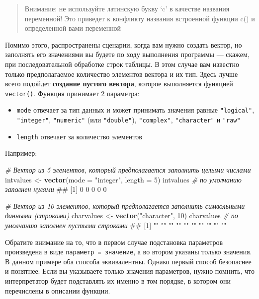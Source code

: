 \documentclass[]{book}
\newenvironment{Shaded}{\begin{snugshade}}{\end{snugshade}}
\newcommand{\KeywordTok}[1]{\textcolor[rgb]{0.13,0.29,0.53}{\textbf{#1}}}
\newcommand{\DataTypeTok}[1]{\textcolor[rgb]{0.13,0.29,0.53}{#1}}
\newcommand{\DecValTok}[1]{\textcolor[rgb]{0.00,0.00,0.81}{#1}}
\newcommand{\StringTok}[1]{\textcolor[rgb]{0.31,0.60,0.02}{#1}}
\newcommand{\CommentTok}[1]{\textcolor[rgb]{0.56,0.35,0.01}{\textit{#1}}}
\newcommand{\NormalTok}[1]{#1}
\providecommand{\tightlist}{%
  \setlength{\itemsep}{0pt}\setlength{\parskip}{0pt}}
\begin{document}
\begin{quote}
Внимание: не используйте латинскую букву `c' в качестве названия
переменной! Это приведет к конфликту названия встроенной функции c() и
определенной вами переменной
\end{quote}

Помимо этого, распространены сценарии, когда вам нужно создать вектор,
но заполнять его значениями вы будете по ходу выполнения программы ---
скажем, при последовательной обработке строк таблицы. В этом случае вам
известно только предполагаемое количество элементов вектора и их тип.
Здесь лучше всего подойдет \textbf{создание пустого вектора}, которое
выполняется функцией \texttt{vector()}. Функция принимает 2 параметра:

\begin{itemize}
\tightlist
\item
  \texttt{mode} отвечает за тип данных и может принимать значения равные
  \texttt{"logical"}, \texttt{"integer"}, \texttt{"numeric"} (или
  \texttt{"double"}), \texttt{"complex"}, \texttt{"character"} и
  \texttt{"raw"}
\item
  \texttt{length} отвечает за количество элементов
\end{itemize}

Например:

\begin{Shaded}
\begin{Highlighting}[]
\CommentTok{# Вектор из 5 элементов, который предполагается заполнить целыми числами}
\NormalTok{intvalues <-}\StringTok{ }\KeywordTok{vector}\NormalTok{(}\DataTypeTok{mode =} \StringTok{"integer"}\NormalTok{, }\DataTypeTok{length =} \DecValTok{5}\NormalTok{)}
\NormalTok{intvalues }\CommentTok{# по умолчанию заполнен нулями}
\NormalTok{## [1] 0 0 0 0 0}

\CommentTok{# Вектор из 10 элементов, который предполагается заполнить символьными данными (строками)}
\NormalTok{charvalues <-}\StringTok{ }\KeywordTok{vector}\NormalTok{(}\StringTok{"character"}\NormalTok{, }\DecValTok{10}\NormalTok{)}
\NormalTok{charvalues }\CommentTok{# по умолчанию заполнен пустыми строками}
\NormalTok{##  [1] "" "" "" "" "" "" "" "" "" ""}
\end{Highlighting}
\end{Shaded}

Обратите внимание на то, что в первом случае подстановка параметров
произведена в виде \texttt{параметр\ =\ значение}, а во втором указаны
только значения. В данном примере оба способа эквивалентны. Однако
первый способ безопаснее и понятнее. Если вы указываете только значения
параметров, нужно помнить, что интерпретатор будет подставлять их именно
в том порядке, в котором они перечислены в описании функции.
\end{document}
